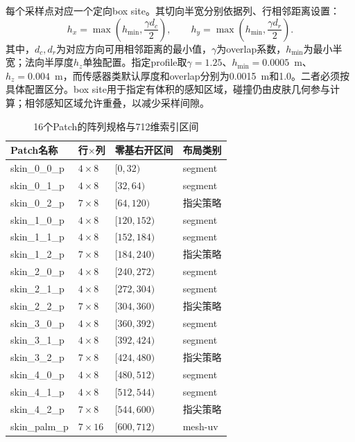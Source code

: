 每个采样点对应一个定向box site。其切向半宽分别依据列、行相邻距离设置：
\begin{equation}
 h_x=\max\!\left(h_{\min},\frac{\gamma d_c}{2}\right),\qquad
 h_y=\max\!\left(h_{\min},\frac{\gamma d_r}{2}\right).
 \label{eq:ch02_site_size}
\end{equation}
其中，$d_c,d_r$为对应方向可用相邻距离的最小值，$\gamma$为overlap系数，$h_{\min}$为最小半宽；法向半厚度$h_z$单独配置。指定profile取$\gamma=1.25$、$h_{\min}=0.0005$~m、$h_z=0.004$~m，而传感器类默认厚度和overlap分别为0.0015~m和1.0。二者必须按具体配置区分。box site用于指定有体积的感知区域，碰撞仍由皮肤几何参与计算；相邻感知区域允许重叠，以减少采样间隙。

\begin{table}[htbp]
  \centering\small
  \caption{16个Patch的阵列规格与712维索引区间}
  \label{tab:ch02_patch_layout}
  \begin{tabular}{llll}
    \hline
    Patch名称 & 行$\times$列 & 零基右开区间 & 布局类别\\
    \hline
    skin\_0\_0\_p & $4\times8$ & $[0,32)$ & segment\\
    skin\_0\_1\_p & $4\times8$ & $[32,64)$ & segment\\
    skin\_0\_2\_p & $7\times8$ & $[64,120)$ & 指尖策略\\
    skin\_1\_0\_p & $4\times8$ & $[120,152)$ & segment\\
    skin\_1\_1\_p & $4\times8$ & $[152,184)$ & segment\\
    skin\_1\_2\_p & $7\times8$ & $[184,240)$ & 指尖策略\\
    skin\_2\_0\_p & $4\times8$ & $[240,272)$ & segment\\
    skin\_2\_1\_p & $4\times8$ & $[272,304)$ & segment\\
    skin\_2\_2\_p & $7\times8$ & $[304,360)$ & 指尖策略\\
    skin\_3\_0\_p & $4\times8$ & $[360,392)$ & segment\\
    skin\_3\_1\_p & $4\times8$ & $[392,424)$ & segment\\
    skin\_3\_2\_p & $7\times8$ & $[424,480)$ & 指尖策略\\
    skin\_4\_0\_p & $4\times8$ & $[480,512)$ & segment\\
    skin\_4\_1\_p & $4\times8$ & $[512,544)$ & segment\\
    skin\_4\_2\_p & $7\times8$ & $[544,600)$ & 指尖策略\\
    skin\_palm\_p & $7\times16$ & $[600,712)$ & mesh-uv\\
    \hline
  \end{tabular}
\end{table}

